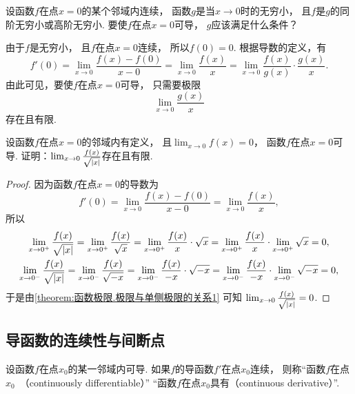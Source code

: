 \begin{example}
设函数\(f\)在点\(x=0\)的某个邻域内连续，
函数\(g\)是当\(x\to0\)时的无穷小，
且\(f\)是\(g\)的同阶无穷小或高阶无穷小.
要使\(f\)在点\(x=0\)可导，
\(g\)应该满足什么条件？
\begin{solution}
由于\(f\)是无穷小，
且\(f\)在点\(x=0\)连续，
所以\(f(0) = 0\).
根据导数的定义，有\[
	f'(0)
	= \lim_{x\to0} \frac{f(x) - f(0)}{x-0} %
	= \lim_{x\to0} \frac{f(x)}{x} %
	= \lim_{x\to0} \frac{f(x)}{g(x)} \cdot \frac{g(x)}{x}. %
\]
由此可见，要使\(f\)在点\(x=0\)可导，
只需要极限\[
	\lim_{x\to0} \frac{g(x)}{x} %
\]存在且有限.
\end{solution}
\end{example}
\begin{example}
设函数\(f\)在点\(x=0\)的邻域内有定义，
且\(\lim_{x\to0} f(x) = 0\)，
函数\(f\)在点\(x=0\)可导.
证明：\(\lim_{x\to0} \frac{f(x)}{\sqrt{\abs{x}}}\)存在且有限.
\begin{proof}
因为函数\(f\)在点\(x=0\)的导数为\begin{equation*}
	f'(0)
	= \lim_{x\to0} \frac{f(x) - f(0)}{x - 0}
	= \lim_{x\to0} \frac{f(x)}{x},
\end{equation*}
所以\begin{gather*}
	\lim_{x\to0^+} \frac{f(x)}{\sqrt{\abs{x}}}
	= \lim_{x\to0^+} \frac{f(x)}{\sqrt{x}}
	= \lim_{x\to0^+} \frac{f(x)}{x} \cdot \sqrt{x}
	= \lim_{x\to0^+} \frac{f(x)}{x} \cdot \lim_{x\to0^+} \sqrt{x}
	= 0, \\
	\lim_{x\to0^-} \frac{f(x)}{\sqrt{\abs{x}}}
	= \lim_{x\to0^-} \frac{f(x)}{\sqrt{-x}}
	= \lim_{x\to0^-} \frac{f(x)}{-x} \cdot \sqrt{-x}
	= \lim_{x\to0^-} \frac{f(x)}{-x} \cdot \lim_{x\to0^-} \sqrt{-x}
	= 0,
\end{gather*}
于是由\cref{theorem:函数极限.极限与单侧极限的关系1} 可知
\(\lim_{x\to0} \frac{f(x)}{\sqrt{\abs{x}}} = 0\).
\end{proof}
\end{example}

\subsection{导函数的连续性与间断点}
\begin{definition}
设函数\(f\)在点\(x_0\)的某一邻域内可导.
如果\(f\)的导函数\(f'\)在点\(x_0\)连续，
则称“函数\(f\)在点\(x_0\)~（continuously differentiable）”
“函数\(f\)在点\(x_0\)具有（continuous derivative）”.
\end{definition}

